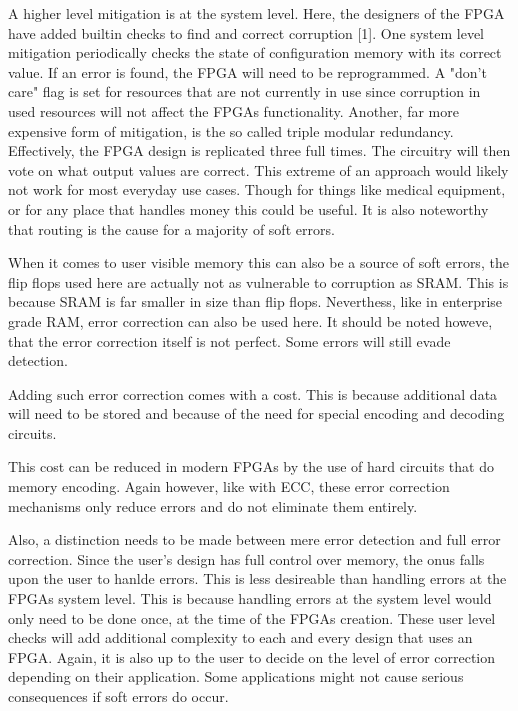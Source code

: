 \documentclass{article}
\begin{document}
    A higher level mitigation is at the system level. Here, the designers of the FPGA have added builtin checks
    to find and correct corruption [1].
    One system level mitigation periodically checks the state of configuration memory
    with its correct value. If an error is found, the FPGA will need to be reprogrammed.
    A "don't care" flag is set for resources that are not currently in use since
    corruption in used resources will not affect the FPGAs functionality.
    Another, far more expensive form of mitigation, is the so called triple modular
    redundancy. Effectively, the FPGA design is replicated three full times.
    The circuitry will then vote on what output values are correct.
    This extreme of an approach would likely not work for most everyday use cases.
    Though for things like medical equipment, or for any place that handles money this
    could be useful.
    It is also noteworthy that routing is the cause for a majority of soft errors.

    When it comes to user visible memory this can also be a source of soft errors,
    the flip flops used here are actually not as vulnerable to corruption as SRAM.
    This is because SRAM is far smaller in size than flip flops. Neverthess,
    like in enterprise grade RAM, error correction can also be used here.
    It should be noted howeve, that the error correction itself is not perfect. Some
    errors will still evade detection.

    Adding such error correction comes with a cost. This is because additional data will
    need to be stored and because of the need for special encoding and decoding circuits.

    This cost can be reduced in modern FPGAs by the use of hard circuits that
    do memory encoding. Again however, like with ECC, these error correction mechanisms
    only reduce errors and do not eliminate them entirely.

    Also, a distinction needs to be made between mere error detection and full error correction.
    Since the user's design has full control over memory, the onus falls upon the user
    to hanlde errors. This is less desireable than handling errors at the FPGAs system level.
    This is because handling errors at the system level would only need to be done once,
    at the time of the FPGAs creation. These user level checks will add additional complexity
    to each and every design that uses an FPGA.
    Again, it is also up to the user to decide on the level of error correction depending
    on their application. Some applications might not cause serious consequences if
    soft errors do occur.
\end{document}
